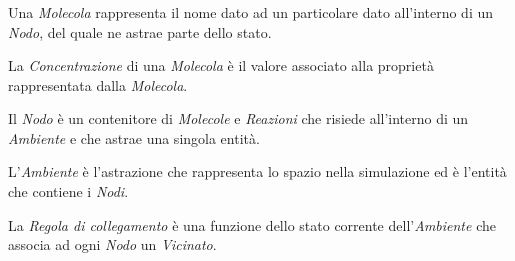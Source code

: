 \documentclass[%
]{beamer}
\begin{document}

    \begin{frame}
        \frametitle{\insertsection}
        \framesubtitle{\insertsubsection}

        \begin{description}[<+->]
            \item[Molecola]\label{itm:mol}
                Una \emph{Molecola} rappresenta il nome dato ad un particolare dato all'interno di un \emph{Nodo}, del quale ne astrae parte dello stato.

            \item[Concentrazione]\label{itm:conc}
                La \emph{Concentrazione} di una \emph{Molecola} è il valore associato alla proprietà rappresentata dalla \emph{Molecola}.

            \item[Nodo]\label{itm:node}
                Il \emph{Nodo} è un contenitore di \emph{Molecole} e \emph{Reazioni} che risiede all'interno di un \emph{Ambiente} e che astrae una singola entità.

            \item[Ambiente]\label{itm:env}
                L'\emph{Ambiente} è l'astrazione che rappresenta lo spazio nella simulazione ed è l'entità che contiene i \emph{Nodi}.

            \item[Regola di collegamento]\label{itm:linkr}
                La \emph{Regola di collegamento} è una funzione dello stato corrente dell'\emph{Ambiente} che associa ad ogni \emph{Nodo} un \emph{Vicinato}.
        \end{description}
    \end{frame}
\end{document}
